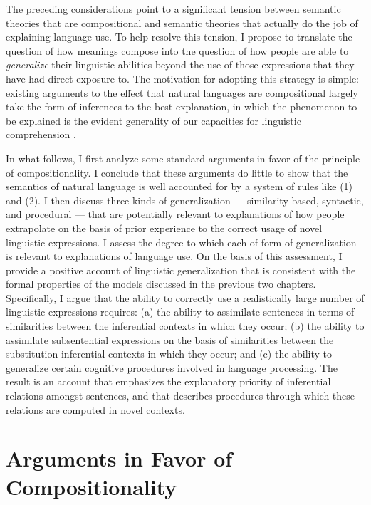 The preceding considerations point to a significant tension between semantic theories that are compositional and semantic theories that actually do the job of explaining language use. To help resolve this tension, I propose to translate the question of how meanings compose into the question of how people are able to \textit{generalize} their linguistic abilities beyond the use of those expressions that they have had direct exposure to. The motivation for adopting this strategy is simple: existing arguments to the effect that natural languages are compositional largely take the form of inferences to the best explanation, in which the phenomenon to be explained is the evident generality of our capacities for linguistic comprehension \citep{Szabo:2013,Szabo:2012}.

In what follows, I first analyze some standard arguments in favor of the principle of compositionality. I conclude that these arguments do little to show that the semantics of natural language is well accounted for by a system of rules like (1) and (2). I then discuss three kinds of generalization --- similarity-based, syntactic, and procedural --- that are potentially relevant to explanations of how people extrapolate on the basis of prior experience to the correct usage of novel linguistic expressions. I assess the degree to which each of form of generalization is relevant to explanations of language use. On the basis of this assessment, I provide a positive account of linguistic generalization that is consistent with the formal properties of the models discussed in the previous two chapters. Specifically, I argue that the ability to correctly use a realistically large number of linguistic expressions requires: (a) the ability to assimilate sentences in terms of similarities between the inferential contexts in which they occur; (b) the ability to assimilate subsentential expressions on the basis of similarities between the substitution-inferential contexts in which they occur; and (c) the ability to generalize certain cognitive procedures involved in language processing. The result is an account that emphasizes the explanatory priority of inferential relations amongst sentences, and that describes procedures through which these relations are computed in novel contexts. 

\section{Arguments in Favor of Compositionality}

